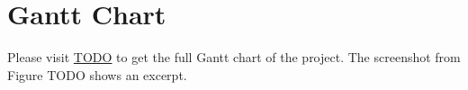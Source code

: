 \section{Gantt Chart}

Please visit \url{TODO} to get the full Gantt chart of the project. The
screenshot from Figure TODO shows an excerpt.
